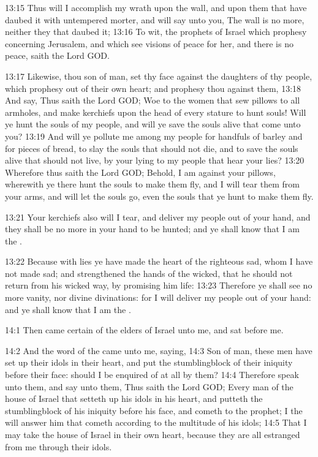 13:15 Thus will I accomplish my wrath upon the wall, and upon them that have daubed it with untempered morter, and will say unto you, The wall is no more, neither they that daubed it; 13:16 To wit, the prophets of Israel which prophesy concerning Jerusalem, and which see visions of peace for her, and there is no peace, saith the Lord GOD.

13:17 Likewise, thou son of man, set thy face against the daughters of thy people, which prophesy out of their own heart; and prophesy thou against them, 13:18 And say, Thus saith the Lord GOD; Woe to the women that sew pillows to all armholes, and make kerchiefs upon the head of every stature to hunt souls! Will ye hunt the souls of my people, and will ye save the souls alive that come unto you?  13:19 And will ye pollute me among my people for handfuls of barley and for pieces of bread, to slay the souls that should not die, and to save the souls alive that should not live, by your lying to my people that hear your lies?  13:20 Wherefore thus saith the Lord GOD; Behold, I am against your pillows, wherewith ye there hunt the souls to make them fly, and I will tear them from your arms, and will let the souls go, even the souls that ye hunt to make them fly.

13:21 Your kerchiefs also will I tear, and deliver my people out of your hand, and they shall be no more in your hand to be hunted; and ye shall know that I am the \LORD.

13:22 Because with lies ye have made the heart of the righteous sad, whom I have not made sad; and strengthened the hands of the wicked, that he should not return from his wicked way, by promising him life: 13:23 Therefore ye shall see no more vanity, nor divine divinations: for I will deliver my people out of your hand: and ye shall know that I am the \LORD.

14:1 Then came certain of the elders of Israel unto me, and sat before me.

14:2 And the word of the \LORD came unto me, saying, 14:3 Son of man, these men have set up their idols in their heart, and put the stumblingblock of their iniquity before their face: should I be enquired of at all by them?  14:4 Therefore speak unto them, and say unto them, Thus saith the Lord GOD; Every man of the house of Israel that setteth up his idols in his heart, and putteth the stumblingblock of his iniquity before his face, and cometh to the prophet; I the \LORD will answer him that cometh according to the multitude of his idols; 14:5 That I may take the house of Israel in their own heart, because they are all estranged from me through their idols.

